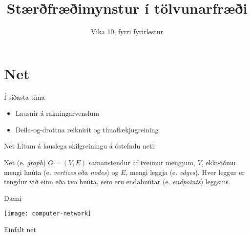 \documentclass[handout]{beamer}
\title{Stærðfræðimynstur í tölvunarfræði}
\subtitle{Vika 10, fyrri fyrirlestur}
\begin{document}
\begin{frame}
\titlepage
\end{frame}


\section{Net}

\begin{frame}{Í síðasta tíma}
    \begin{itemize}
     \item Lausnir á rakningarvenslum
     \item Deila-og-drottna reiknirit og tímaflækjugreining
    \end{itemize}
\end{frame}

\begin{frame}{Net}
Lítum á lauslega skilgreiningu á óstefndu neti:

\begin{tcolorbox}[title=Net]
Net (e. \emph{graph}) $G = (V, E)$ samanstendur af tveimur mengjum, $V$, ekki-tómu mengi hnúta (e. \emph{vertices} eða \emph{nodes}) og $E$, mengi leggja (e. \emph{edges}). Hver leggur er tengdur við einn eða tvo hnúta, sem eru endahnútar (e. \emph{endpoints}) leggsins.
\end{tcolorbox}
\end{frame}

\begin{frame}{Dæmi}
\begin{center}
\texttt{[image: computer-network]}

Einfalt net
\end{center}
\end{frame}
\end{document}
